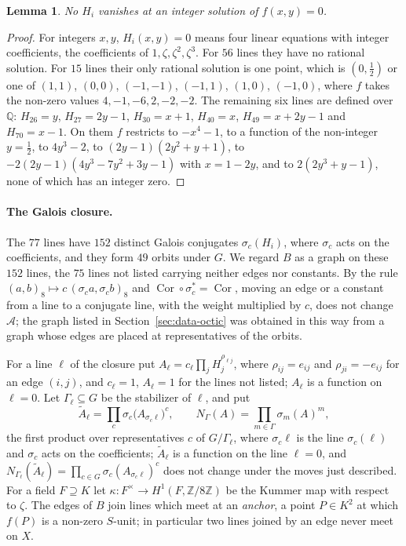 \documentclass[11pt]{article}
\newtheorem{lemma}[theorem]{Lemma}
\newcommand{\Z}{\mathbb{Z}}
\newcommand{\Q}{\mathbb{Q}}
\newcommand{\Cor}{\operatorname{Cor}}
\begin{document}
\begin{lemma}\label{lem:nonzero8}
No $H_i$ vanishes at an integer solution of $f(x,y)=0$.
\end{lemma}

\begin{proof}
For integers $x,y$, $H_i(x,y)=0$ means four linear equations with integer coefficients, the coefficients of $1,\zeta,\zeta^2,\zeta^3$. For $56$ lines they have no rational solution. For $15$ lines their only rational solution is one point, which is $(0,\tfrac12)$ or one of $(1,1)$, $(0,0)$, $(-1,-1)$, $(-1,1)$, $(1,0)$, $(-1,0)$, where $f$ takes the non-zero values $4,-1,-6,2,-2,-2$. The remaining six lines are defined over $\Q$: $H_{26}=y$, $H_{27}=2y-1$, $H_{30}=x+1$, $H_{40}=x$, $H_{49}=x+2y-1$ and $H_{70}=x-1$. On them $f$ restricts to $-x^4-1$, to a function of the non-integer $y=\frac12$, to $4y^3-2$, to $(2y-1)(2y^2+y+1)$, to $-2(2y-1)(4y^3-7y^2+3y-1)$ with $x=1-2y$, and to $2(2y^3+y-1)$, none of which has an integer zero.
\end{proof}

\paragraph{The Galois closure.} The $77$ lines have $152$ distinct Galois conjugates $\sigma_c(H_i)$, where $\sigma_c$ acts on the coefficients, and they form $49$ orbits under $G$. We regard $B$ as a graph on these $152$ lines, the $75$ lines not listed carrying neither edges nor constants. By the rule $(a,b)_8\mapsto c\,(\sigma_ca,\sigma_cb)_8$ and $\Cor\circ\sigma_c^*=\Cor$, moving an edge or a constant from a line to a conjugate line, with the weight multiplied by $c$, does not change $\mathcal A$; the graph listed in Section~\ref{sec:data-octic} was obtained in this way from a graph whose edges are placed at representatives of the orbits.

For a line $\ell$ of the closure put $A_\ell=c_\ell\prod_jH_j^{\rho_{\ell j}}$, where $\rho_{ij}=e_{ij}$ and $\rho_{ji}=-e_{ij}$ for an edge $(i,j)$, and $c_\ell=1$, $A_\ell=1$ for the lines not listed; $A_\ell$ is a function on $\ell=0$. Let $\Gamma_\ell\subseteq G$ be the stabilizer of $\ell$, and put
\[
\tilde A_\ell=\prod_{c}\sigma_c\bigl(A_{\sigma_c\ell}\bigr)^{c},\qquad N_\Gamma(A)=\prod_{m\in\Gamma}\sigma_m(A)^m,
\]
the first product over representatives $c$ of $G/\Gamma_\ell$, where $\sigma_c\ell$ is the line $\sigma_c(\ell)$ and $\sigma_c$ acts on the coefficients; $\tilde A_\ell$ is a function on the line $\ell=0$, and $N_{\Gamma_\ell}(\tilde A_\ell)=\prod_{c\in G}\sigma_c(A_{\sigma_c\ell})^c$ does not change under the moves just described. For a field $F\supseteq K$ let $\kappa\colon F^\times\to H^1(F,\Z/8\Z)$ be the Kummer map with respect to $\zeta$. The edges of $B$ join lines which meet at an \emph{anchor}, a point $P\in K^2$ at which $f(P)$ is a non-zero $S$-unit; in particular two lines joined by an edge never meet on $X$.
\end{document}
